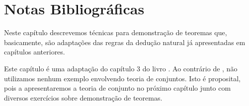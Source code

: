 \section{Notas Bibliográficas}

Neste capítulo descrevemos técnicas para demonstração de teoremas que,
basicamente, são adaptações das regras da dedução natural já apresentadas em capítulos
anteriores.

Este capítulo é uma adaptação do capítulo 3 do livro
\cite{Velleman06}. Ao contrário de \cite{Velleman06}, não utilizamos nenhum
exemplo envolvendo teoria de conjuntos. Isto é proposital, pois a
apresentaremos a teoria de conjunto no próximo capítulo junto com
diversos exercícios sobre demonstração de teoremas.